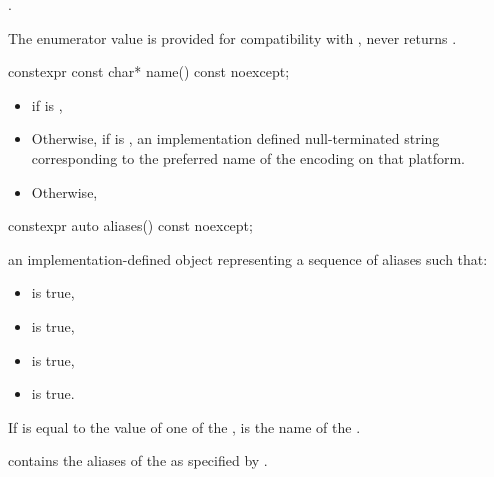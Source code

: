 \documentclass{wg21}
\begin{document}
\begin{addedblock}
\begin{itemdescr}
\returns {}.

\begin{note}
	The enumerator value  is provided for compatibility with \cite{rfc3808},
	 never returns .
\end{note}

\end{itemdescr}

\begin{itemdecl}
constexpr const char* name() const noexcept;
\end{itemdecl}
\begin{itemdescr}
\returns 

\begin{itemize}
    \item {} if  is ,
    \item Otherwise, if  is , an implementation defined null-terminated string corresponding to the preferred name of the encoding on that platform.
    \item Otherwise, 
\end{itemize}
\end{itemdescr}


\begin{itemdecl}
constexpr auto aliases() const noexcept;
\end{itemdecl}

\begin{itemdescr}
\returns an implementation-defined object  representing a sequence of aliases such that:
\begin{itemize}
    \item {} is true,
    \item {} is true,
    \item {} is true,
    \item {} is true.
\end{itemize}

\pnum If  is equal to the  value of one of the ,  is the name of the .

 contains the aliases of the  as specified by \cite{rfc2978}.


\end{itemdescr}
\end{addedblock}
\end{document}
